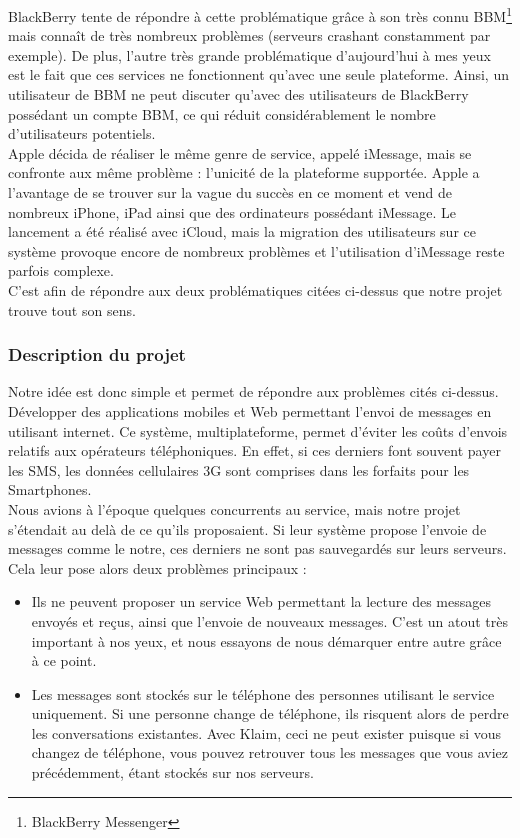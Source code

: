 \documentclass{article}
\begin{document}
	BlackBerry tente de répondre à cette problématique grâce à son très connu BBM\footnote{BlackBerry Messenger} mais connaît de très nombreux problèmes (serveurs crashant constamment par exemple). De plus, l’autre très grande problématique d’aujourd’hui à mes yeux est le fait que ces services ne fonctionnent qu’avec une seule plateforme. Ainsi, un utilisateur de BBM ne peut discuter qu’avec des utilisateurs de BlackBerry possédant un compte BBM, ce qui réduit considérablement le nombre d'utilisateurs potentiels. \\
	
	Apple décida de réaliser le même genre de service, appelé iMessage, mais se confronte aux même problème : l’unicité de la plateforme supportée. Apple a l'avantage de se trouver sur la vague du succès en ce moment et vend de nombreux iPhone, iPad ainsi que des ordinateurs possédant iMessage. Le lancement a été réalisé avec iCloud, mais la migration des utilisateurs sur ce système provoque encore de nombreux problèmes et l'utilisation d'iMessage reste parfois complexe.\\
	
	C’est afin de répondre aux deux problématiques citées ci-dessus que notre projet trouve tout son sens.

\subsubsection{Description du projet}
	Notre idée est donc simple et permet de répondre aux problèmes cités ci-dessus. Développer des applications mobiles et Web permettant l’envoi de messages en utilisant internet. Ce système, multiplateforme, permet d’éviter les coûts d’envois relatifs aux opérateurs téléphoniques. En effet, si ces derniers font souvent payer les SMS, les données cellulaires 3G sont comprises dans les forfaits pour les Smartphones.\\
	
	Nous avions à l’époque quelques concurrents au service, mais notre projet s’étendait au delà de ce qu’ils proposaient. Si leur système propose l’envoie de messages comme le notre, ces derniers ne sont pas sauvegardés sur leurs serveurs. Cela leur pose alors deux problèmes principaux :
	\begin{itemize}
		\item Ils ne peuvent proposer un service Web permettant la lecture des messages envoyés et reçus, ainsi que l’envoie de nouveaux messages. C'est un atout très important à nos yeux, et nous essayons de nous démarquer entre autre grâce à ce point.
		\item Les messages sont stockés sur le téléphone des personnes utilisant le service uniquement. Si une personne change de téléphone, ils risquent alors de perdre les conversations existantes. Avec Klaim, ceci ne peut exister puisque si vous changez de téléphone, vous pouvez retrouver tous les messages que vous aviez précédemment, étant stockés sur nos serveurs.\\
	\end{itemize}
\end{document}
